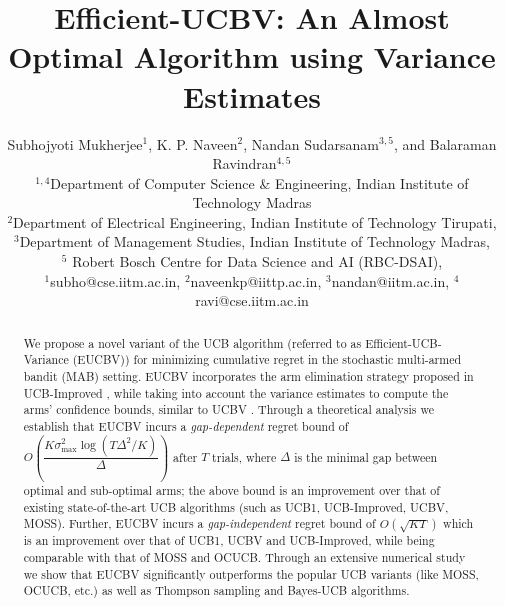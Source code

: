 \documentclass[letterpaper]{article} %
\begin{document}
%
\title{Efficient-UCBV: An Almost Optimal Algorithm using Variance Estimates}
\author{Subhojyoti Mukherjee${}^1$, K. P. Naveen${}^2$, Nandan
Sudarsanam${}^{3,5}$, and Balaraman Ravindran${}^{4,5}$\\
${}^{1,4}$Department of Computer Science \& Engineering, Indian Institute of
Technology Madras\\ ${}^2$Department of Electrical Engineering, Indian Institute of
Technology Tirupati,\\
${}^3$Department of Management Studies, Indian Institute of
Technology Madras,\\
${}^5$ Robert Bosch Centre for Data Science and AI (RBC-DSAI),\\
${}^1$subho@cse.iitm.ac.in, ${}^2$naveenkp@iittp.ac.in, ${}^3$nandan@iitm.ac.in, ${}^4$ravi@cse.iitm.ac.in}


\maketitle

\begin{abstract}
We propose a novel variant of the UCB algorithm (referred to as Efficient-UCB-Variance (EUCBV)) for minimizing cumulative regret in the stochastic multi-armed bandit (MAB) setting. EUCBV incorporates the arm elimination strategy proposed in UCB-Improved \citep{auer2010ucb}, while taking into account the variance estimates to compute the arms' confidence bounds, similar to UCBV \citep{audibert2009exploration}. Through a theoretical analysis we establish that EUCBV incurs a \emph{gap-dependent} regret bound of {\scriptsize $O\left( \dfrac{K\sigma^2_{\max} \log (T\Delta^2 /K)}{\Delta}\right)$} after $T$ trials, where $\Delta$ is the minimal gap between optimal and sub-optimal arms; the above bound is an improvement over that of existing state-of-the-art UCB algorithms (such as UCB1, UCB-Improved, UCBV,  MOSS). Further, EUCBV incurs a \emph{gap-independent} regret bound of {\scriptsize $O\left(\sqrt{KT}\right)$}  which is an improvement over that of UCB1, UCBV and UCB-Improved, while being comparable with that of MOSS and OCUCB. Through an extensive numerical study we show that EUCBV significantly outperforms the popular UCB variants (like MOSS, OCUCB, etc.) as well as Thompson sampling and Bayes-UCB algorithms. 

\end{abstract}
\end{document}

